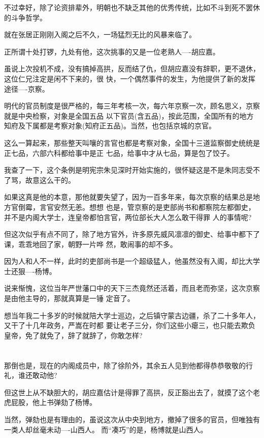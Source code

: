 \documentclass[11pt,a4paper,onecolumn]{article}
\begin{document}
不过幸好，除了论资排辈外，明朝也不缺乏其他的优秀传统，比如不斗到死不罢休的斗争哲学。

就在张居正刚刚入阁之后不久，一场猛烈无比的风暴来临了。

正所谓十处打锣，九处有他，这次挑事的又是一位老熟人----胡应嘉。

虽说上次投机不成，没有搞掉高拱，反而结了仇，但胡应嘉没有辞职，更不退休，这位仁兄注定是闲不下来的，很
快，一个偶然事件的发生，为他提供了新的发挥途径----京察。

明代的官员制度是很严格的，每三年考核一次，每六年京察一次，顾名思义，京察就是中央检察，对象是全国五品
以下官员(含五品)，按此范围，全国所有的地方知府及下属都是考察对象(知府正五品)。当然，也包括京城的京官。

这么一算起来，那些整天叫嚷的言官也都是考察对象，全国十三道监察御史统统是正七品，六部六科都给事中是正
七品，给事中才从七品，算是包了饺子。

我查了一下，这个条例是明宪宗朱见深时开始实施的，很怀疑这是不是朱同志受不了骂，故意这么干的。

如果这真是他的本意，那他就要失望了，因为一百多年来，每次京察的结果总是地方官倒霉，言官安然无恙。想想
也是，管京察的是吏部尚书和都察院左都御史，并不是内阁大学士，连皇帝都怕言官，两位部长大人怎么敢干得罪
人的事情呢?

但这次似乎有点不同了，除了地方官外，许多原先威风凛凛的御史、给事中都下了课，乖乖地回了家，朝野一片哗
然，敢闹事的却不多。

因为人和人不一样，此时的吏部尚书是一个超级猛人，他虽然没有入阁，却比大学士还狠----杨博。

说来惭愧，这位当年严世藩口中的天下三杰竟然还活着，而且老而弥坚，这次京察是由他主导的，那就真算是一锤
定音了。

想当年我二十多岁的时候就陪大学士巡边，之后镇守蒙古边疆，杀了二十多年人，又干了十几年政务，严嵩在时都
要让老子三分，你们这些小瘪三，也只能去欺负皇帝，免了就免了，辞了就辞了，你敢怎样?

\section[\thesection]{}

那倒也是，现在的内阁成员中，除了徐阶外，其余五人见到他都得恭恭敬敬的行礼，谁还敢动他?

但这世上从不缺胆大的，胡应嘉估计是得罪了高拱，反正豁出去了，就摸了这个老虎屁股，他上书弹劾了杨博。

当然，弹劾也是有理由的，虽说这次从中央到地方，撤掉了很多的官员，但唯独有一类人却丝毫未动----山西人。
而``凑巧''的是，杨博就是山西人。
\end{document}
